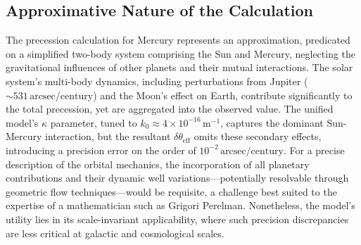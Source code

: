 \documentclass[a4paper,12pt]{article}
\begin{document}
\subsection{Approximative Nature of the Calculation}
The precession calculation for Mercury represents an approximation, predicated on a simplified two-body system comprising the Sun and Mercury, neglecting the gravitational influences of other planets and their mutual interactions. The solar system's multi-body dynamics, including perturbations from Jupiter (\( \sim 531 \, \text{arcsec/century} \)) and the Moon's effect on Earth, contribute significantly to the total precession, yet are aggregated into the observed value. The unified model's \( \kappa \) parameter, tuned to \( k_0 \approx 4 \times 10^{-16} \, \text{m}^{-1} \), captures the dominant Sun-Mercury interaction, but the resultant \( \delta\theta_{\mathrm{eff}} \) omits these secondary effects, introducing a precision error on the order of \( 10^{-2} \, \text{arcsec/century} \). For a precise description of the orbital mechanics, the incorporation of all planetary contributions and their dynamic well variations—potentially resolvable through geometric flow techniques—would be requisite, a challenge best suited to the expertise of a mathematician such as Grigori Perelman. Nonetheless, the model's utility lies in its scale-invariant applicability, where such precision discrepancies are less critical at galactic and cosmological scales.
\end{document}
